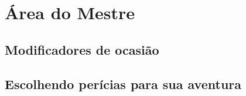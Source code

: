 \chapter{\label{ch:mestre}Área do Mestre}

\section{Modificadores de ocasião}


\section{\label{sec:escolhaPericias}Escolhendo perícias para sua aventura}